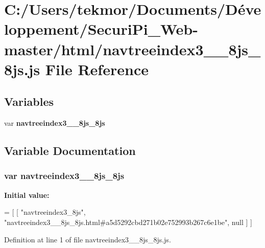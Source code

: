 \section{C\+:/\+Users/tekmor/\+Documents/\+Développement/\+Securi\+Pi\+\_\+\+Web-\/master/html/navtreeindex3\+\_\+\+\_\+8js\+\_\+8js.js File Reference}
\label{navtreeindex3____8js__8js_8js}
\subsection*{Variables}
\begin{DoxyCompactItemize}
\item 
var {\bf navtreeindex3\+\_\+\+\_\+8js\+\_\+8js}
\end{DoxyCompactItemize}


\subsection{Variable Documentation}
\subsubsection[{navtreeindex3\+\_\+\+\_\+8js\+\_\+8js}]{\setlength{\rightskip}{0pt plus 5cm}var navtreeindex3\+\_\+\+\_\+8js\+\_\+8js}\label{navtreeindex3____8js__8js_8js_a5efe11aa4694798cbf0398391b865fee}
{\bfseries Initial value\+:}
\begin{DoxyCode}
=
[
    [ \textcolor{stringliteral}{"navtreeindex3\_8js"}, \textcolor{stringliteral}{"navtreeindex3\_\_8js\_8js.html#a5d5292cbd271b02e752993b267c6e1be"}, null ]
]
\end{DoxyCode}


Definition at line 1 of file navtreeindex3\+\_\+\+\_\+8js\+\_\+8js.\+js.

